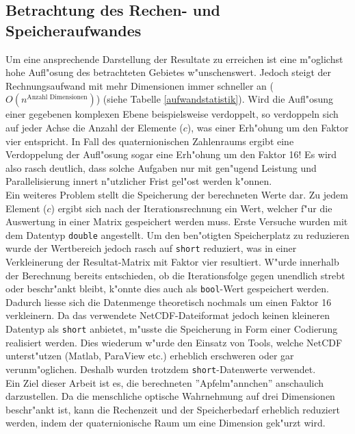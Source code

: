 \begin{refsection}
	\subsection{Betrachtung des Rechen- und Speicheraufwandes}
		Um eine ansprechende Darstellung der Resultate zu erreichen ist eine m"oglichst hohe Aufl"osung des betrachteten Gebietes w"unschenswert. Jedoch steigt der Rechnungsaufwand mit mehr Dimensionen immer schneller an ($O(n^{\text{Anzahl Dimensionen}})$) (siehe Tabelle \ref{aufwandstatistik}). Wird die Aufl"osung einer gegebenen komplexen Ebene beispielsweise verdoppelt, so verdoppeln sich auf jeder Achse die Anzahl der Elemente ($c$), was einer Erh"ohung um den Faktor vier entspricht. In Fall des quaternionischen Zahlenraums ergibt eine Verdoppelung der Aufl"osung sogar eine Erh"ohung um den Faktor 16! Es wird also rasch deutlich, dass solche Aufgaben nur mit gen"ugend Leistung und Parallelisierung innert n"utzlicher Frist gel"ost werden k"onnen.\\[0.3cm]
		Ein weiteres Problem stellt die Speicherung der berechneten Werte dar. Zu jedem Element ($c$) ergibt sich nach der Iterationsrechnung ein Wert, welcher f"ur die Auswertung in einer Matrix gespeichert werden muss. Erste Versuche wurden mit dem Datentyp {\tt double} angestellt. Um den ben"otigten Speicherplatz zu reduzieren wurde der Wertbereich jedoch rasch auf {\tt short} reduziert, was in einer Verkleinerung der Resultat-Matrix mit Faktor vier resultiert. W"urde innerhalb der Berechnung bereits entschieden, ob die Iterationsfolge gegen unendlich strebt oder beschr"ankt bleibt, k"onnte dies auch als {\tt bool}-Wert gespeichert werden. Dadurch liesse sich die Datenmenge theoretisch nochmals um einen Faktor 16 verkleinern. Da das verwendete NetCDF-Dateiformat jedoch keinen kleineren Datentyp als {\tt short} anbietet, m"usste die Speicherung in Form einer Codierung realisiert werden. Dies wiederum w"urde den Einsatz von Tools, welche NetCDF unterst"utzen (Matlab, ParaView etc.) erheblich erschweren oder gar verunm"oglichen. Deshalb wurden trotzdem  {\tt short}-Datenwerte verwendet. \\[0.3cm]
		Ein Ziel dieser Arbeit ist es, die berechneten ''Apfelm"annchen'' anschaulich darzustellen. Da die menschliche optische Wahrnehmung auf drei Dimensionen beschr"ankt ist, kann die Rechenzeit und der Speicherbedarf erheblich reduziert werden, indem der quaternionische Raum um eine Dimension gek"urzt wird. 
		\begin{table}[ht]\centering
			\begin{tabular}{|l|l|l|l|l|}

\end{tabular}
\end{table}
\end{refsection}
